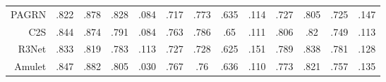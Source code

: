 \begin{table}[!ht]
{\begin{tabular}{rcccccccccccc}
			PAGRN \upcite{wang2018detect}
			& .822 & .878 & .828 & .084 
			& .717 & .773 & .635 & .114 
			& .727 & .805 & .725 & .147 \\
			
			C2S   \upcite{li2018contour}
			& .844 & .874 & .791 & .084 
			& .763 & .786 & .65  & .111 
			& .806 & .82  & .749 & .113 \\
			
			R3Net  \upcite{deng2018r3net}
			& .833 & .819 & .783 & .113 
			& .727 & .728 & .625 & .151 
			& .789 & .838 & .781 & .128 \\
			
			Amulet \upcite{zhang2017amulet}
			& .847 & .882 & .805 & .030 
			& .767 & .76  & .636 & .110  
			& .773 & .821 & .757 & .135 \\
			
			
			\bottomrule[1.5pt] %
		\end{tabular}
	}
\end{table}



